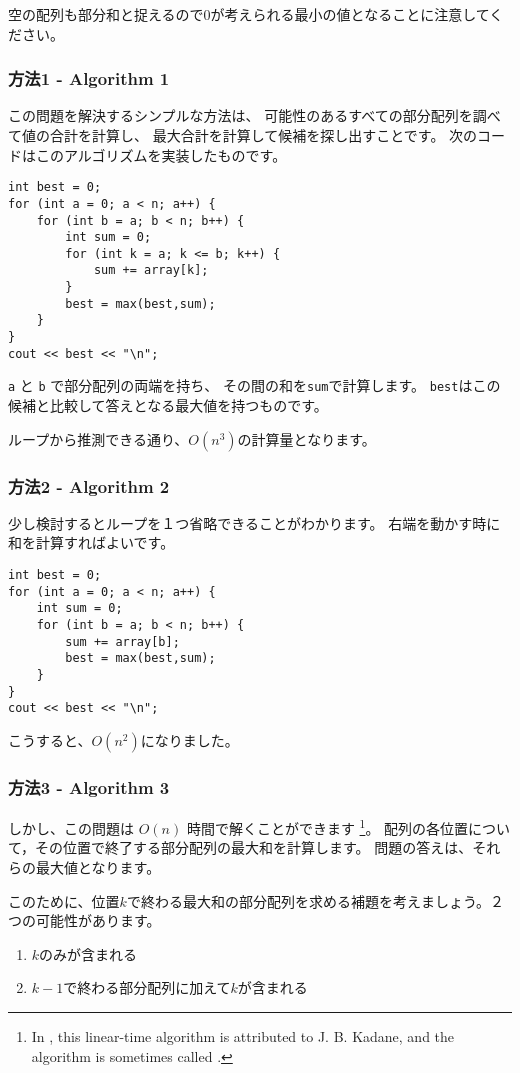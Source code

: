 空の配列も部分和と捉えるので$0$が考えられる最小の値となることに注意してください。

\subsubsection{方法1 - Algorithm 1}

この問題を解決するシンプルな方法は、
可能性のあるすべての部分配列を調べて値の合計を計算し、
最大合計を計算して候補を探し出すことです。
次のコードはこのアルゴリズムを実装したものです。

\begin{lstlisting}
int best = 0;
for (int a = 0; a < n; a++) {
    for (int b = a; b < n; b++) {
        int sum = 0;
        for (int k = a; k <= b; k++) {
            sum += array[k];
        }
        best = max(best,sum);
    }
}
cout << best << "\n";
\end{lstlisting}

\texttt{a} と \texttt{b} で部分配列の両端を持ち、
その間の和を\texttt{sum}で計算します。
\texttt{best}はこの候補と比較して答えとなる最大値を持つものです。

ループから推測できる通り、$O(n^3)$の計算量となります。

\subsubsection{方法2 - Algorithm 2}

少し検討するとループを１つ省略できることがわかります。
右端を動かす時に和を計算すればよいです。
\begin{lstlisting}
int best = 0;
for (int a = 0; a < n; a++) {
    int sum = 0;
    for (int b = a; b < n; b++) {
        sum += array[b];
        best = max(best,sum);
    }
}
cout << best << "\n";
\end{lstlisting}
こうすると、$O(n^2)$になりました。

\subsubsection{方法3 - Algorithm 3}

しかし、この問題は $O(n)$ 時間で解くことができます
\footnote{In \cite{ben86}, this linear-time algorithm
is attributed to J. B. Kadane, and the algorithm is sometimes
called  .}。
配列の各位置について，その位置で終了する部分配列の最大和を計算します。
問題の答えは、それらの最大値となります。

このために、位置$k$で終わる最大和の部分配列を求める補題を考えましょう。２つの可能性があります。
\begin{enumerate}
\item $k$のみが含まれる
\item $k-1$で終わる部分配列に加えて$k$が含まれる
\end{enumerate}


